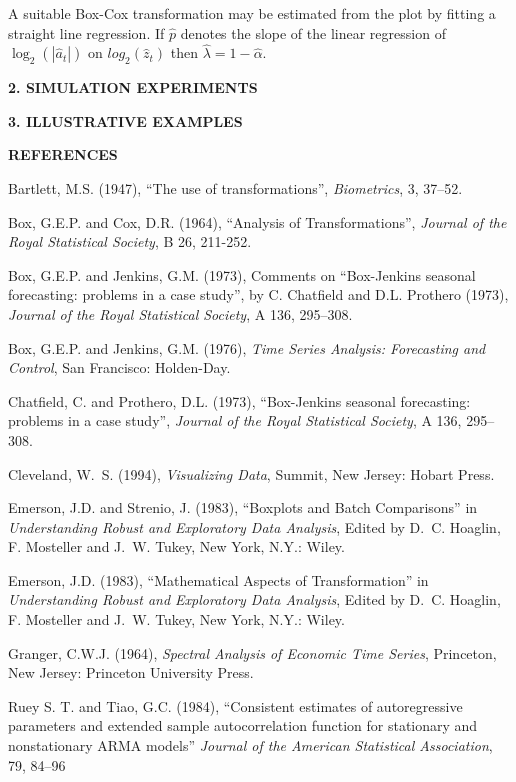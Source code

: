 A suitable Box-Cox transformation may be estimated from the plot
by fitting a straight line regression. 
If $\hat p$ denotes the slope of the linear regression of 
$\log_2(|\hat a_t|)$ on $log_2(\hat z_t)$ then
$\hat \lambda = 1-\hat \alpha$.
\bigskip
\centerline{\bf 2. SIMULATION EXPERIMENTS}
\bigskip
\bigskip
\centerline{\bf 3. ILLUSTRATIVE EXAMPLES}
\bigskip
\bigskip
\centerline{\bf REFERENCES}
\bigskip
\parindent 0pt

\hind
Bartlett, M.S. (1947),
``The use of transformations'', 
{\it Biometrics\/}, 3, 37--52.

\hind
Box, G.E.P. and Cox, D.R. (1964),
``Analysis of Transformations'',
{\it Journal of the Royal Statistical Society\/}, B 26, 211-252.

\hind
Box, G.E.P. and Jenkins, G.M. (1973),
Comments on
``Box-Jenkins seasonal forecasting: problems in a case study'',
by 
C. Chatfield and D.L. Prothero (1973),
{\it Journal of the Royal Statistical Society\/}, A 136, 295--308.

\hind
Box, G.E.P. and Jenkins, G.M. (1976),
{\it Time Series Analysis: Forecasting and Control\/},
San Francisco: Holden-Day.

\hind Chatfield, C. and Prothero, D.L. (1973),
``Box-Jenkins seasonal forecasting: problems in a case study'',
{\it Journal of the Royal Statistical Society\/}, A 136, 295--308.

\hind
Cleveland, W.~S. (1994),
{\it Visualizing Data\/}, Summit, New Jersey: Hobart Press.

\hind
Emerson, J.D. and Strenio, J. (1983),
``Boxplots and Batch Comparisons''
in {\it Understanding Robust and Exploratory Data Analysis\/},
Edited by D.~C. Hoaglin, F. Mosteller and J.~W. Tukey,
New York, N.Y.: Wiley.

\hind
Emerson, J.D. (1983),
``Mathematical Aspects of Transformation''
in {\it Understanding Robust and Exploratory Data Analysis\/},
Edited by D.~C. Hoaglin, F. Mosteller and J.~W. Tukey,
New York, N.Y.: Wiley.

\hind
Granger, C.W.J. (1964),
{\it Spectral Analysis of Economic Time Series\/},
Princeton, New Jersey: Princeton University Press.

\hind
Ruey S. T. and Tiao, G.C. (1984),
``Consistent estimates of autoregressive parameters and extended sample autocorrelation function 
for stationary and nonstationary ARMA models''
{\it Journal of the American Statistical Association\/}, 79, 84--96


